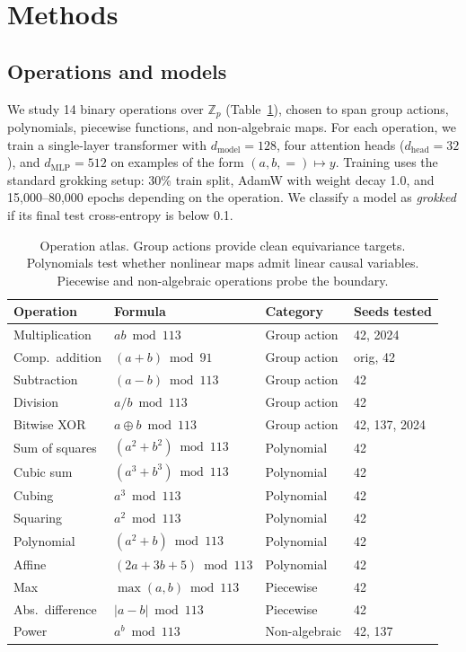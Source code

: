\documentclass{article}
\newcommand{\Z}{\mathbb{Z}}
\begin{document}
\section{Methods}
\label{sec:methods}

\subsection{Operations and models}

We study 14 binary operations over $\Z_p$ (Table~\ref{tab:operations}), chosen
to span group actions, polynomials, piecewise functions, and non-algebraic maps.
For each operation, we train a single-layer transformer with
$d_\text{model} = 128$, four attention heads ($d_\text{head} = 32$), and
$d_\text{MLP} = 512$ on examples of the form $(a, b, {=}) \mapsto y$. Training
uses the standard grokking setup: 30\% train split, AdamW with weight decay 1.0,
and 15{,}000--80{,}000 epochs depending on the operation. We classify a model as
\emph{grokked} if its final test cross-entropy is below 0.1.

\begin{table}[t]
\centering
\small
\begin{tabular}{llll}
\toprule
Operation & Formula & Category & Seeds tested \\
\midrule
Multiplication & $ab \bmod 113$ & Group action & 42, 2024 \\
Comp.\ addition & $(a{+}b) \bmod 91$ & Group action & orig, 42 \\
Subtraction & $(a{-}b) \bmod 113$ & Group action & 42 \\
Division & $a/b \bmod 113$ & Group action & 42 \\
Bitwise XOR & $a \oplus b \bmod 113$ & Group action & 42, 137, 2024 \\
\midrule
Sum of squares & $(a^2{+}b^2) \bmod 113$ & Polynomial & 42 \\
Cubic sum & $(a^3{+}b^3) \bmod 113$ & Polynomial & 42 \\
Cubing & $a^3 \bmod 113$ & Polynomial & 42 \\
Squaring & $a^2 \bmod 113$ & Polynomial & 42 \\
Polynomial & $(a^2{+}b) \bmod 113$ & Polynomial & 42 \\
Affine & $(2a{+}3b{+}5) \bmod 113$ & Polynomial & 42 \\
\midrule
Max & $\max(a,b) \bmod 113$ & Piecewise & 42 \\
Abs.\ difference & $|a{-}b| \bmod 113$ & Piecewise & 42 \\
Power & $a^b \bmod 113$ & Non-algebraic & 42, 137 \\
\bottomrule
\end{tabular}
\caption{Operation atlas. Group actions provide clean equivariance targets.
Polynomials test whether nonlinear maps admit linear causal variables. Piecewise
and non-algebraic operations probe the boundary.}
\label{tab:operations}
\end{table}
\end{document}

